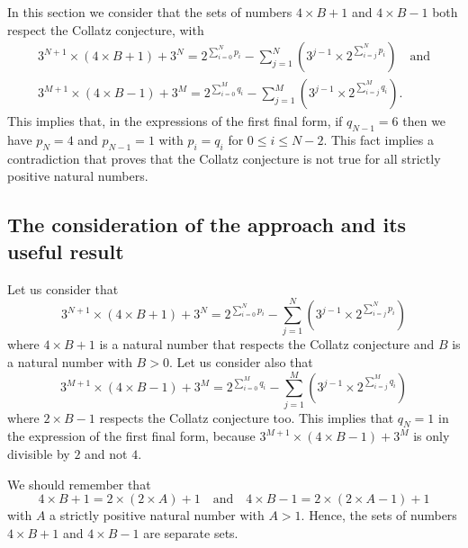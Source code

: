 \documentclass[11pt,a4paper]{article}
\newcommand{\Pf}[4]{2^{\sum_{#4=0}^{#1}#3_{#4}}-\sum_{j=1}^{#2}\left(3^{j-1}\times 2^{\sum_{#4=j}^{#1}#3_{#4}}\right)}
\theoremstyle{definition}
\begin{document}
In this section we consider that the sets of numbers $4\times B+1$ and $4\times B-1$ both
respect the Collatz conjecture, with
\begin{gather*}
3^{N+1}\times(4\times B+1)+3^{N}=\Pf{N}{N}{p}{i}\quad\text{and}\\
3^{M+1}\times(4\times B-1)+3^{M}=\Pf{M}{M}{q}{i}.
\end{gather*}
This implies that, in the expressions of the first final form, if $q_{N-1}=6$ then we have
$p_N=4$ and $p_{N-1}=1$ with $p_i=q_i$ for $0\le i\le N-2$. This fact implies a
contradiction that proves that the Collatz conjecture is not true for all strictly positive
natural numbers.

\subsection{The consideration of the approach and its useful result}
Let us consider that
\begin{equation}
3^{N+1}\times(4\times B+1)+3^{N}=\Pf{N}{N}{p}{i}
\end{equation}
where $4\times B+1$ is a natural number that respects the Collatz conjecture and $B$ is a
natural number with $B>0$. Let us consider also that
\begin{equation}
3^{M+1}\times(4\times B-1)+3^{M}=\Pf{M}{M}{q}{i}
\end{equation}
where $2\times B-1$ respects the Collatz conjecture too. This implies that $q_N=1$ in the
expression of the first final form, because $3^{M+1}\times(4\times B-1)+3^{M}$ is only
divisible by $2$ and not $4$.

We should remember that
\begin{equation}
4\times B+1=2\times(2\times A)+1\quad\text{and}\quad 4\times B-1=2\times(2\times A-1)+1
\end{equation}
with $A$ a strictly positive natural number with $A>1$. Hence, the sets of numbers
$4\times B+1$ and $4\times B-1$ are separate sets.
\end{document}
